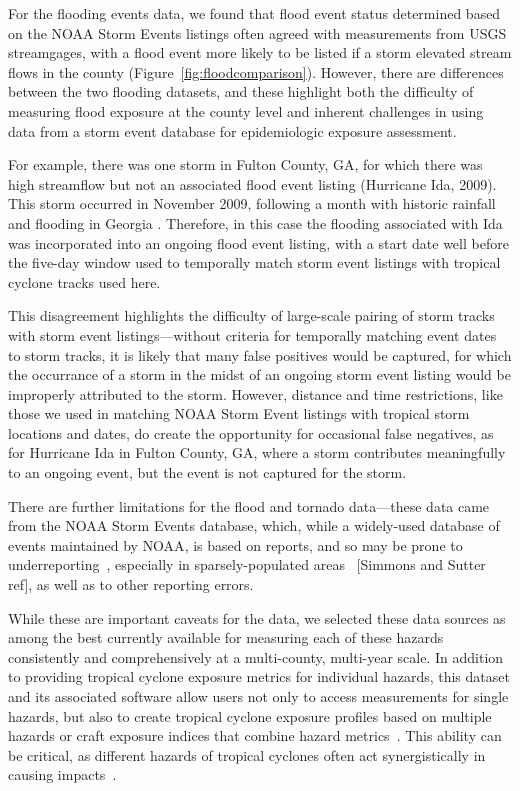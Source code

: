 For the flooding events data, we found that flood event status determined based
on the NOAA Storm Events listings often agreed with measurements from \ac{USGS}
streamgages, with a flood event more likely to be listed if a storm elevated
stream flows in the county (Figure~\ref{fig:floodcomparison}).  However, there
are differences between the two flooding datasets, and these highlight both the
difficulty of measuring flood exposure at the county level and inherent
challenges in using data from a storm event database for epidemiologic exposure
assessment. 

For example, there was one storm in Fulton County, GA, for which there was high
streamflow but not an associated flood event listing (Hurricane Ida, 2009).
This storm occurred in November 2009, following a month with historic rainfall
and flooding in Georgia \parencite{shepherd2011overview}.  Therefore, in this
case the flooding associated with Ida was incorporated into an ongoing flood
event listing, with a start date well before the five-day window used to
temporally match storm event listings with tropical cyclone tracks used here. 

This disagreement highlights the difficulty of large-scale pairing of storm
tracks with storm event listings---without criteria for temporally matching
event dates to storm tracks, it is likely that many false positives would be
captured, for which the occurrance of a storm in the midst of an ongoing storm
event listing would be improperly attributed to the storm.  However, distance
and time restrictions, like those we used in matching NOAA Storm Event listings
with tropical storm locations and dates, do create the opportunity for
occasional false negatives, as for Hurricane Ida in Fulton County, GA, where a
storm contributes meaningfully to an ongoing event, but the event is not
captured for the storm.  

There are further limitations for the flood and tornado data---these data came
from the \ac{NOAA} Storm Events database, which, while a widely-used database
of events maintained by \ac{NOAA}, is based on reports, and so may be prone to
underreporting~\parencite{Ashley2008flood, Curran2000}, especially in
sparsely-populated areas~\parencite{Witt1998, Ashley2007} [Simmons and Sutter
ref], as well as to other reporting errors. 

While these are important caveats for the data, we selected these data sources
as among the best currently available for measuring each of these hazards
consistently and comprehensively at a multi-county, multi-year scale. In
addition to providing tropical cyclone exposure metrics for individual hazards,
this dataset and its associated software allow users not only to access
measurements for single hazards, but also to create tropical cyclone exposure
profiles based on multiple hazards or craft exposure indices that combine
hazard metrics~\parencite{chakraborty2005population, peduzzi2009assessing}.
This ability can be critical, as different hazards of tropical cyclones often
act synergistically in causing impacts~\parencite{smith2009}.  


